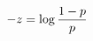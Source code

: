 \documentclass[preview]{standalone}
\begin{document}
\begin{align*}
\special{dvisvgm:raw <g id='unique000'>}-z=\log{\frac{1-p}{p}}\special{dvisvgm:raw </g>}
\end{align*}
\end{document}
